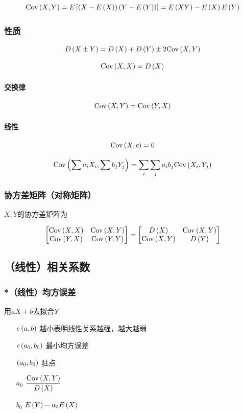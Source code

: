 \documentclass{article}
\begin{document}
\[\cov XY=E\left[\p{X-E\p{X}}\p{Y-E\p{Y}}\right]=E\p{XY}-E\p{X}E\p{Y}\]

\subsubsection{性质}

\[D\p{X\pm Y}=D\p{X}+D\p{Y}\pm2\cov XY\]

\[\cov XX=D\p{X}\]

\paragraph{交换律}

\[\cov XY=\cov YX\]

\paragraph{线性}

\[\cov Xc=0\]

\[\cov{\sum a_iX_i}{\sum b_jY_j}=\sum_i\sum_ja_ib_j\cov{X_i}{Y_j}\]

\subsubsection{协方差矩阵（对称矩阵）}

$X,Y$的协方差矩阵为

\[\begin{bmatrix}
        \cov XX & \cov XY \\
        \cov YX & \cov YY
    \end{bmatrix}=
    \begin{bmatrix}
        D\p{X}  & \cov XY \\
        \cov XY & D\p{Y}
    \end{bmatrix}\]

\subsection{（线性）相关系数}

\subsubsection{*（线性）均方误差}

用$aX+b$去拟合$Y$

\begin{enumerate}
    \item [$e\p{a,b}$] 越小表明线性关系越强，越大越弱
    \item [$e\p{a_0,b_0}$] 最小均方误差
    \item [$\p{a_0,b_0}$] 驻点
    \item [$a_0$] $\dfrac{\cov XY}{D\p{X}}$
    \item [$b_0$] $E\p{Y}-a_0E\p{X}$
\end{enumerate}
\end{document}
